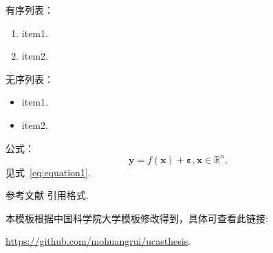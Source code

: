 {{有序列表：
\begin{enumerate}
    \item item1.
    \item item2.
\end{enumerate}

无序列表：
\begin{itemize}
    \item item1.
    \item item2.
\end{itemize}

公式：
\begin{equation}
    \boldsymbol{y} = f(\boldsymbol{x}) + \boldsymbol{\varepsilon}, \boldsymbol{x}\in\mathbb{R}^n, \label{eq:equation1}
\end{equation}
见式~\eqref{eq:equation1}.

参考文献  引用格式\cite{journal, inproceedings, book}.

\vspace*{2cm}
{\colorbox[rgb]{0.9,0.6,0.2}{本模板根据中国科学院大学模板修改得到，具体可查看此链接:}}

{\colorbox[rgb]{0.9,0.6,0.2}{\href{https://github.com/mohuangrui/ucasthesis}{https://github.com/mohuangrui/ucasthesis}.}}


}
}

